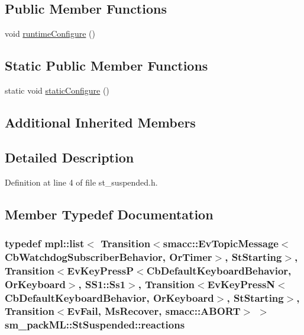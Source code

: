 \subsection*{Public Member Functions}
\begin{DoxyCompactItemize}
\item 
void \hyperlink{structsm__packML_1_1StSuspended_aa5fedfb9adb0495a7280376ea388e7dc}{runtime\+Configure} ()
\end{DoxyCompactItemize}
\subsection*{Static Public Member Functions}
\begin{DoxyCompactItemize}
\item 
static void \hyperlink{structsm__packML_1_1StSuspended_a0c51815b7d6c3b2eca298a7fe5f4b504}{static\+Configure} ()
\end{DoxyCompactItemize}
\subsection*{Additional Inherited Members}


\subsection{Detailed Description}


Definition at line 4 of file st\+\_\+suspended.\+h.



\subsection{Member Typedef Documentation}
\subsubsection[{\texorpdfstring{reactions}{reactions}}]{\setlength{\rightskip}{0pt plus 5cm}typedef mpl\+::list$<$ Transition$<${\bf smacc\+::\+Ev\+Topic\+Message}$<${\bf Cb\+Watchdog\+Subscriber\+Behavior}, {\bf Or\+Timer}$>$, {\bf St\+Starting}$>$, Transition$<$Ev\+Key\+PressP$<$Cb\+Default\+Keyboard\+Behavior, {\bf Or\+Keyboard}$>$, {\bf S\+S1\+::\+Ss1}$>$, Transition$<$Ev\+Key\+PressN$<$Cb\+Default\+Keyboard\+Behavior, {\bf Or\+Keyboard}$>$, {\bf St\+Starting}$>$, Transition$<${\bf Ev\+Fail}, {\bf Ms\+Recover}, {\bf smacc\+::\+A\+B\+O\+RT}$>$ $>$ {\bf sm\+\_\+pack\+M\+L\+::\+St\+Suspended\+::reactions}}\hypertarget{structsm__packML_1_1StSuspended_a0d2af02072d0e0e19e54e5cc944153dc}{}\label{structsm__packML_1_1StSuspended_a0d2af02072d0e0e19e54e5cc944153dc}


